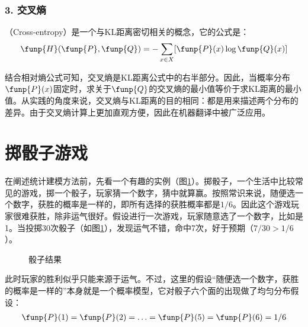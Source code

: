 \subsubsection{3. 交叉熵}

（Cross-entropy）是一个与KL距离密切相关的概念，它的公式是：
\begin{eqnarray}
\funp{H}(\funp{P},\funp{Q})=-\sum_{x \in X} [\funp{P}(x) \log \funp{Q}(x) ]
\label{eq:2-16}
\end{eqnarray}

\parinterval 结合相对熵公式可知，交叉熵是KL距离公式中的右半部分。因此，当概率分布$\funp{P}(x)$固定时，求关于$\funp{Q}$的交叉熵的最小值等价于求KL距离的最小值。从实践的角度来说，交叉熵与KL距离的目的相同：都是用来描述两个分布的差异。由于交叉熵计算上更加直观方便，因此在机器翻译中被广泛应用。


\sectionnewpage
\section{掷骰子游戏}

\parinterval 在阐述统计建模方法前，先看一个有趣的实例（图\ref{fig:2-4}）。掷骰子，一个生活中比较常见的游戏，掷一个骰子，玩家猜一个数字，猜中就算赢。按照常识来说，随便选一个数字，获胜的概率是一样的，即所有选择的获胜概率都是$1/6$。因此这个游戏玩家很难获胜，除非运气很好。假设进行一次游戏，玩家随意选了一个数字，比如是1。当投掷30次骰子（如图\ref{fig:2-4}），发现运气不错，命中7次，好于预期（$7/30 > 1/6$）。
\vspace{-0.5em}

\begin{figure}[htp]
\centering

\caption{骰子结果}
\label{fig:2-4}
\end{figure}

\parinterval 此时玩家的胜利似乎只能来源于运气。不过，这里的假设“随便选一个数字，获胜的概率是一样的”本身就是一个概率模型，它对骰子六个面的出现做了均匀分布假设：
\begin{eqnarray}
\funp{P}(\text{1})=\funp{P}(\text{2})= \ldots =\funp{P}(\text{5})=\funp{P}(\text{6})=1/6
\label{eq:2-17}
\end{eqnarray}

